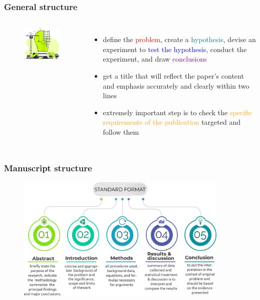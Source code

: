 \documentclass[newPxFont,sthlmFooter]{beamer}
\newcommand{\fs}{\footnotesize}
\begin{document}
\begin{frame}\frametitle{General structure}
  \begin{columns}[T,onlytextwidth]
  \begin{figure}
    \centering
    \includegraphics[width=2in]{figs/strc} 
  \end{figure}
  \begin{itemize}
  \fs
    \item define the \textcolor{red}{problem}, create a \textcolor{teal}{hypothesis}, devise an experiment to \textcolor{blue}{test the hypothesis}, conduct the experiment, and draw \textcolor{purple}{conclusions}
    \item get a title that will reflect the paper's content and emphasis accurately and clearly within two lines
    \item extremely important step is to check the \textcolor{orange}{specific requirements of the publication} targeted and follow them
  \end{itemize}
  \vspace{-2cm}
  \end{columns}
\end{frame}

\begin{frame}\frametitle{Manuscript structure}
  \vspace{-0.5cm}
  \begin{figure}
    \centering
    \includegraphics[width=4in]{figs/chart} 
  \end{figure}
\end{frame}
\end{document}
